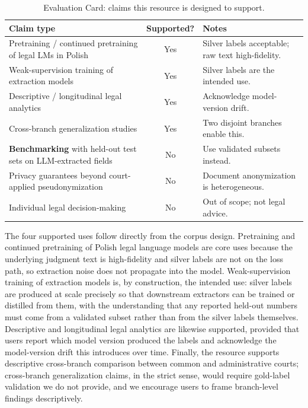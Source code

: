 \begin{table}[h]
\centering
\small
\begin{tabular}{lcl}
\toprule
\textbf{Claim type} & \textbf{Supported?} & \textbf{Notes} \\
\midrule
Pretraining / continued pretraining of legal LMs in Polish & Yes & Silver labels acceptable; raw text high-fidelity. \\
Weak-supervision training of extraction models & Yes & Silver labels are the intended use. \\
Descriptive / longitudinal legal analytics & Yes & Acknowledge model-version drift. \\
Cross-branch generalization studies & Yes & Two disjoint branches enable this. \\
\textbf{Benchmarking} with held-out test sets on LLM-extracted fields & No & Use validated subsets instead. \\
Privacy guarantees beyond court-applied pseudonymization & No & Document anonymization is heterogeneous. \\
Individual legal decision-making & No & Out of scope; not legal advice. \\
\bottomrule
\end{tabular}
\caption{Evaluation Card: claims this resource is designed to support.}
\label{tab:eval-card}
\end{table}

The four supported uses follow directly from the corpus design. Pretraining and continued pretraining of Polish legal language models are core uses because the underlying judgment text is high-fidelity and silver labels are not on the loss path, so extraction noise does not propagate into the model. Weak-supervision training of extraction models is, by construction, the intended use: silver labels are produced at scale precisely so that downstream extractors can be trained or distilled from them, with the understanding that any reported held-out numbers must come from a validated subset rather than from the silver labels themselves. Descriptive and longitudinal legal analytics are likewise supported, provided that users report which model version produced the labels and acknowledge the model-version drift this introduces over time. Finally, the resource supports descriptive cross-branch comparison between common and administrative courts; cross-branch generalization claims, in the strict sense, would require gold-label validation we do not provide, and we encourage users to frame branch-level findings descriptively.

